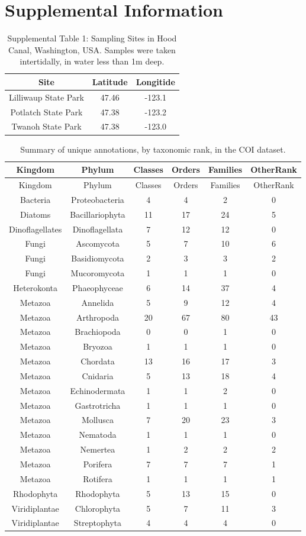 \documentclass[fleqn,10pt,lineno]{wlpeerj} %
\begin{document}
\newpage

\section{Supplemental Information}\label{supplemental-information}

\begin{table}

\caption{\label{tab:Supplement_GPScoordinatesSamplingAreas}Supplemental Table 1: Sampling Sites in Hood Canal, Washington, USA. Samples were taken intertidally, in water less than 1m deep.}
\centering
\begin{tabular}[t]{c|c|c}
\hline
Site & Latitude & Longitide\\
\hline
Lilliwaup State Park & 47.46 & -123.1\\
\hline
Potlatch State Park & 47.38 & -123.2\\
\hline
Twanoh State Park & 47.38 & -123.0\\
\hline
\end{tabular}
\end{table}

\begin{longtable}[]{@{}cccccc@{}}
\caption{Summary of unique annotations, by taxonomic rank, in the COI
dataset.}\tabularnewline
\toprule
Kingdom & Phylum & Classes & Orders & Families &
OtherRank\tabularnewline
\midrule
\endfirsthead
\toprule
Kingdom & Phylum & Classes & Orders & Families &
OtherRank\tabularnewline
\midrule
\endhead
Bacteria & Proteobacteria & 4 & 4 & 2 & 0\tabularnewline
Diatoms & Bacillariophyta & 11 & 17 & 24 & 5\tabularnewline
Dinoflagellates & Dinoflagellata & 7 & 12 & 12 & 0\tabularnewline
Fungi & Ascomycota & 5 & 7 & 10 & 6\tabularnewline
Fungi & Basidiomycota & 2 & 3 & 3 & 2\tabularnewline
Fungi & Mucoromycota & 1 & 1 & 1 & 0\tabularnewline
Heterokonta & Phaeophyceae & 6 & 14 & 37 & 4\tabularnewline
Metazoa & Annelida & 5 & 9 & 12 & 4\tabularnewline
Metazoa & Arthropoda & 20 & 67 & 80 & 43\tabularnewline
Metazoa & Brachiopoda & 0 & 0 & 1 & 0\tabularnewline
Metazoa & Bryozoa & 1 & 1 & 1 & 0\tabularnewline
Metazoa & Chordata & 13 & 16 & 17 & 3\tabularnewline
Metazoa & Cnidaria & 5 & 13 & 18 & 4\tabularnewline
Metazoa & Echinodermata & 1 & 1 & 2 & 0\tabularnewline
Metazoa & Gastrotricha & 1 & 1 & 1 & 0\tabularnewline
Metazoa & Mollusca & 7 & 20 & 23 & 3\tabularnewline
Metazoa & Nematoda & 1 & 1 & 1 & 0\tabularnewline
Metazoa & Nemertea & 1 & 2 & 2 & 2\tabularnewline
Metazoa & Porifera & 7 & 7 & 7 & 1\tabularnewline
Metazoa & Rotifera & 1 & 1 & 1 & 1\tabularnewline
Rhodophyta & Rhodophyta & 5 & 13 & 15 & 0\tabularnewline
Viridiplantae & Chlorophyta & 5 & 7 & 11 & 3\tabularnewline
Viridiplantae & Streptophyta & 4 & 4 & 4 & 0\tabularnewline
\bottomrule
\end{longtable}
\end{document}
